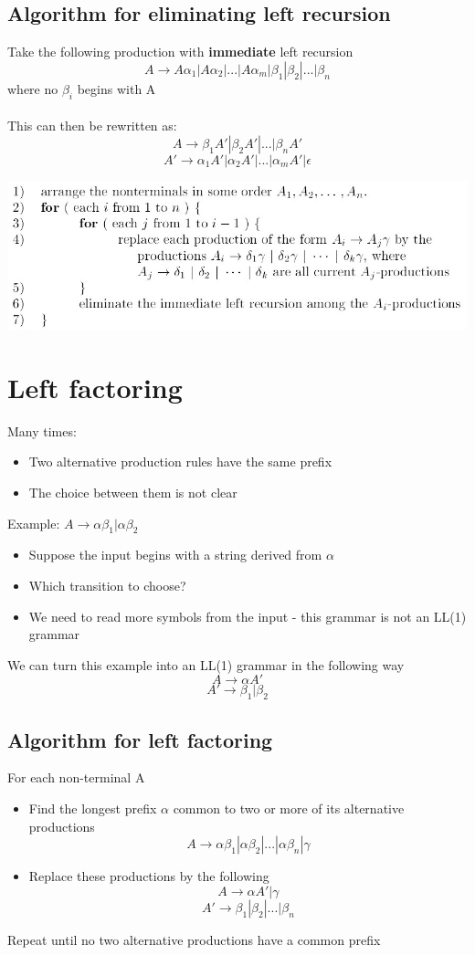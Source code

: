 \documentclass{article}[18pt]
\begin{document}
\subsection{Algorithm for eliminating left recursion}
Take the following production with \textbf{immediate} left recursion
$$A\rightarrow A\alpha_1|A\alpha_2|...|A\alpha_m|\beta_1|\beta_2|...|\beta_n$$
where no $\beta_i$ begins with A\\
\\
This can then be rewritten as:
$$A\rightarrow \beta_1A'|\beta_2A'|...|\beta_nA'$$
$$A'\rightarrow \alpha_1A'|\alpha_2A'|...|\alpha_mA'|\epsilon$$
\begin{center}
	\includegraphics[scale=0.7]{algorithm_left_recursion}
\end{center}
\section{Left factoring}
Many times:
\begin{itemize}
	\item Two alternative production rules have the same prefix
	\item The choice between them is not clear
\end{itemize}
Example: $A\rightarrow \alpha\beta_1|\alpha\beta_2$
\begin{itemize}
	\item Suppose the input begins with a string derived from $\alpha$
	\item Which transition to choose?
	\item We need to read more symbols from the input - this grammar is not an LL(1) grammar
\end{itemize}
We can turn this example into an LL(1) grammar in the following way
$$A\rightarrow \alpha A'$$
$$A' \rightarrow \beta_1|\beta_2$$
\subsection{Algorithm for left factoring}
For each non-terminal A
\begin{itemize}
	\item Find the longest prefix $\alpha$ common to two or more of its alternative productions
	$$A\rightarrow \alpha\beta_1|\alpha\beta_2|...|\alpha\beta_n|\gamma$$
	\item Replace these productions by the following
	$$A\rightarrow \alpha A' | \gamma$$
	$$A'\rightarrow \beta_1|\beta_2|...|\beta_n$$
\end{itemize}
Repeat until no two alternative productions have a common prefix
\end{document}
